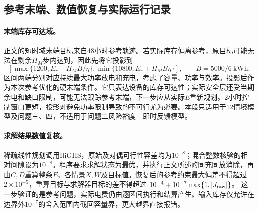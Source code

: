 \subsection{参考末端、数值恢复与实际运行记录}
\label{app:records}

\paragraph{末端库存可达域。}
正文的短时域末端目标来自48小时参考轨迹。若实际库存偏离参考，原目标可能无法在剩余$H_M$步内达到，因此先将它投影到
\begin{equation}
 \left[\max\{1200,E_r-H_MB/\eta\},
       \min\{10800,E_r+H_MB\eta\}\right],\qquad B=5000/6\ \mathrm{kWh}.
\end{equation}
区间两端分别对应持续最大功率放电和充电，考虑了容量、功率与效率。投影后作为本次参考优化的硬末端条件。它只表达设备的库存可达性；实际安全层还受当期余电和缺口限制，可能无法跟踪参考末端，下一步应从实际$E$重新规划。2小时控制窗口更短，投影对避免功率限制导致的不可行尤为必要。本段只适用于12情境模型及问题三、四，不适用于问题二风险裕度—即时反馈模型。

\paragraph{求解结果数值复核。}
稀疏线性规划调用HiGHS，原始及对偶可行性容差均为$10^{-8}$；混合整数核验的相对间隙设为$10^{-8}$。程序要求求解状态为最优，并执行正文所述的同充同放消除，再由$C,D$重算整条$E$、各情景$X,W$及目标值。恢复后的参考约束最大偏差不得超过$2\times10^{-5}$，重算目标与求解器目标的差不得超过
$10^{-4}+10^{-7}\max\{1,|J_{\rm raw}|\}$。
这一步验证的是参考问题，实际电费仍由逐区间执行和结算产生。输入库存仅允许在边界外$10^{-7}$的舍入范围内截回容量界，更大越界直接报错。

